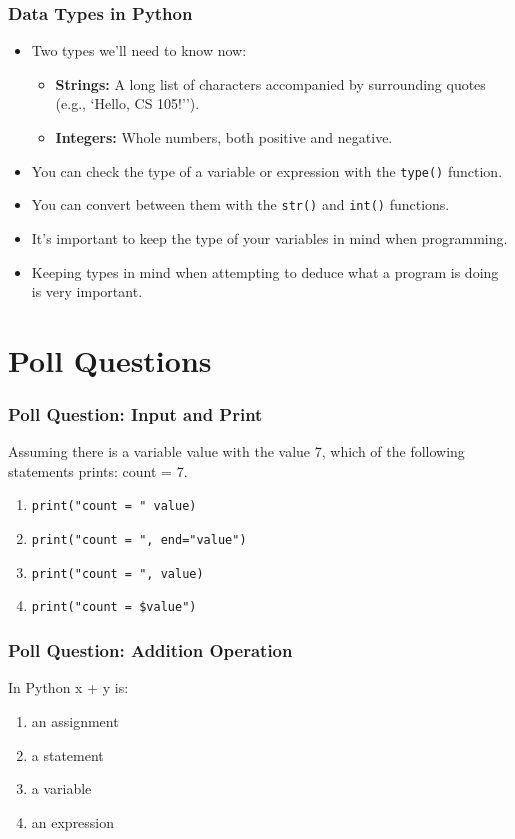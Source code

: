 \documentclass{beamer}
\begin{document}
%
%
\begin{frame}
  \frametitle{Data Types in Python}
  \begin{itemize}
    \item Two types we'll need to know now:
      \begin{itemize}
        \item \textbf{Strings: } A long list of characters accompanied by surrounding quotes (e.g., `Hello, CS 105!'').
        \item \textbf{Integers: } Whole numbers, both positive and negative.
      \end{itemize}
    \item You can check the type of a variable or expression with the \lstinline{type()} function.
    \item You can convert between them with the \lstinline{str()} and \lstinline{int()} functions.
    \item It's important to keep the type of your variables in mind when programming.
    \item Keeping types in mind when attempting to deduce what a program is doing is very important. 
  \end{itemize}
\end{frame}




\section{Poll Questions}

%
% 
%
\begin{frame}[fragile]
  \frametitle{Poll Question: Input and Print}
  Assuming there is a variable value with the value 7, which of the following statements prints: count = 7.
  \begin{enumerate}[A]
    \item \lstinline{print("count = " value)}
    \item \lstinline{print("count = ", end="value")}
    \item \lstinline{print("count = ", value)}
    \item \lstinline{print("count = $value")}
  \end{enumerate}
\end{frame}

%
%
%
\begin{frame}
  \frametitle{Poll Question: Addition Operation}
  In Python x + y is:
  \begin{enumerate}[A]
    \item an assignment
    \item a statement
    \item a variable
    \item an expression
  \end{enumerate}
\end{frame}
\end{document}
